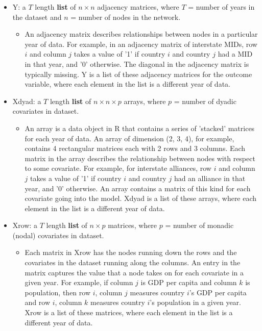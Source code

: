 \documentclass[12pt]{amsart}
\begin{document}
\begin{itemize}[noitemsep,nolistsep]
    \item Y: a $T$ length \textbf{list} of $n\times n$ adjacency matrices, where $T$ = number of years in the dataset and $n$ = number of nodes in the network.
    \begin{itemize}
      \item An adjacency matrix describes relationships between nodes in a particular year of data. For example, in an adjacency matrix of interstate MIDs, row $i$ and column $j$ takes a value of '1' if country $i$ and country $j$ had a MID in that year, and '0' otherwise. The diagonal in the adjacency matrix is typically missing. Y is a list of these adjacency matrices for the outcome variable, where each element in the list is a different year of data.
    \end{itemize}
    \item Xdyad: a $T$ length \textbf{list} of $n\times n\times p$ arrays, where $p$ = number of dyadic covariates in dataset.
    \begin{itemize}
      \item An array is a data object in R that contains a series of 'stacked' matrices for each year of data. An array of dimension (2, 3, 4), for example, contains 4 rectangular matrices each with 2 rows and 3 columns. Each matrix in the array describes the relationship between nodes with respect to some covariate. For example, for interstate alliances, row $i$ and column $j$ takes a value of '1' if country $i$ and country $j$ had an alliance in that year, and '0' otherwise. An array contains a matrix of this kind for each covariate going into the model. Xdyad is a list of these arrays, where each element in the list is a different year of data.
    \end{itemize}
    \item Xrow: a $T$ length \textbf{list} of $n\times p$ matrices, where $p$ = number of monadic (nodal) covariates in dataset.
    \begin{itemize}
      \item Each matrix in Xrow has the nodes running down the rows and the covariates in the dataset running along the columns. An entry in the matrix captures the value that a node takes on for each covariate in a given year. For example, if column $j$ is GDP per capita and column $k$ is population, then row $i$, column $j$ measures country $i$'s GDP per capita and row $i$, column $k$ measures country $i$'s population in a given year. Xrow is a list of these matrices, where each element in the list is a different year of data.
    \end{itemize}
\end{itemize}
\end{document}
